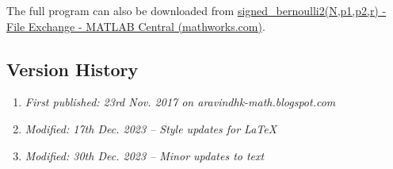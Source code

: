 The full program can also be downloaded from \href{https://www.mathworks.com/matlabcentral/fileexchange/65164-signed_bernoulli2-n-p1-p2-r}{signed\_bernoulli2(N,p1,p2,r) - File Exchange - MATLAB Central (mathworks.com)}.

\subsection{Version History}
\begin{enumerate}
	\item \emph{First published: 23rd Nov. 2017 on aravindhk-math.blogspot.com}
	\item \emph{Modified: 17th Dec. 2023 -- Style updates for \LaTeX}
	\item \emph{Modified: 30th Dec. 2023 -- Minor updates to text}
\end{enumerate}

